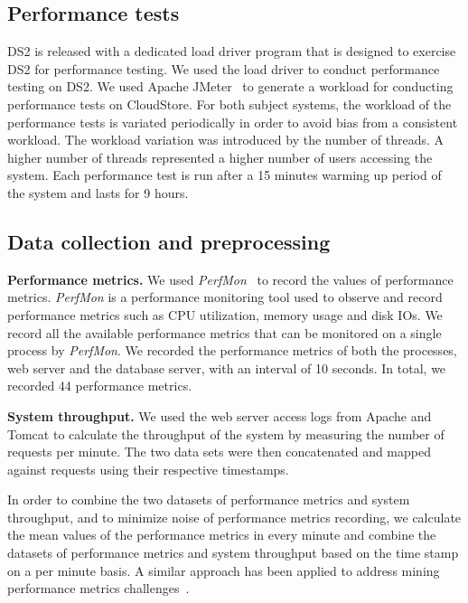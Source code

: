 \subsection{Performance tests}

DS2 is released with a dedicated load driver program that is designed to exercise DS2 for performance testing. We used the load driver to conduct performance testing on DS2. We used Apache JMeter~\cite{apachejmeter} to generate a workload for conducting performance tests on CloudStore. For both subject systems, the workload of the performance tests is variated periodically in order to avoid bias from a consistent workload. The workload variation was introduced by the number of threads. A higher number of threads represented a higher number of users accessing the system. Each performance test is run after a 15 minutes warming up period of the system and lasts for 9 hours. 





\subsection{Data collection and preprocessing}

\noindent \textbf{Performance metrics.} We used \textit{PerfMon}~\cite{perfmon} to record the values of performance metrics. \textit{PerfMon} is a performance monitoring tool used to observe and record performance metrics such as CPU utilization, memory usage and disk IOs. We record all the available performance metrics that can be monitored on a single process by \emph{PerfMon}.  We recorded the performance metrics of both the processes, web server and the database server, with an interval of 10 seconds. In total, we recorded 44 performance metrics. 

\noindent \textbf{System throughput.} We used the web server access logs from Apache and Tomcat to calculate the throughput of the system by measuring the number of requests per minute. The two data sets were then concatenated and mapped against requests using their respective timestamps.

In order to combine the two datasets of performance metrics and system throughput, and to minimize noise of performance metrics recording, we calculate the mean values of the performance metrics in every minute and combine the datasets of performance metrics and system throughput based on the time stamp on a per minute basis. A similar approach has been applied to address mining performance metrics challenges~\cite{foo2010mining}.
